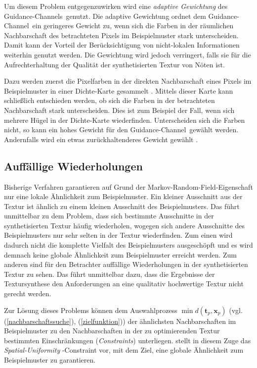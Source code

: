 Um diesem Problem entgegenzuwirken wird eine \emph{adaptive Gewichtung} des \glqq Gui\-dance-Channels\grqq \ genutzt.
Die adaptive Gewichtung ordnet dem \glqq Guidance-Channel\grqq \ ein geringeres Gewicht zu, wenn sich die Farben in der räumlichen Nachbarschaft des betrachteten Pixels im Beispielmuster stark unterscheiden.
Damit kann der Vorteil der Berücksichtigung von nicht-lokalen Informationen weiterhin genutzt werden.
Die Gewichtung wird jedoch verringert, falls sie für die Aufrechterhaltung der Qualität der synthetisierten Textur von Nöten ist.

Dazu werden zuerst die Pixelfarben in der direkten Nachbarschaft eines Pixels im Beispielmuster in einer Dichte-Karte gesammelt \cite{SelfTuning}.
Mittels dieser Karte kann schließlich entschieden werden, ob sich die Farben in der betrachteten Nachbarschaft stark unterscheiden.
Dies ist zum Beispiel der Fall, wenn sich mehrere Hügel in der Dichte-Karte wiederfinden.
Unterscheiden sich die Farben nicht, so kann ein hohes Gewicht für den \glqq Guidance-Channel\grqq \ gewählt werden.
Andernfalls wird ein etwas zurückhaltenderes Gewicht gewählt \cite{SelfTuning}.

\subsection{Auffällige Wiederholungen}

Bisherige Verfahren garantieren auf Grund der \glqq Markov-Random-Field\grqq -Eigenschaft nur eine lokale Ähnlichkeit zum Beispielmuster.
Ein kleiner Ausschnitt aus der Textur ist ähnlich zu einem kleinen Ausschnitt des Beispielmusters.
Das führt unmittelbar zu dem Problem, dass sich bestimmte Ausschnitte in der synthetisierten Textur häufig wiederholen, wogegen sich andere Ausschnitte des Beispielmusters nur sehr selten in der Textur wiederfinden.
Zum einen wird dadurch nicht die komplette Vielfalt des Beispielmusters ausgeschöpft und es wird demnach keine globale Ähnlichkeit zum Beispielmuster erreicht werden.
Zum anderen sind für den Betrachter auffällige Wiederholungen in der synthetisierten Textur zu sehen.
Das führt unmittelbar dazu, dass die Ergebnisse der Textursynthese den Anforderungen an eine qualitativ hochwertige Textur nicht gerecht werden.

Zur Lösung dieses Problems können dem Auswahlprozess $\min d(\textbf{t}_p, \textbf{x}_p)$ (vgl. (\ref{nachbarschaftssuche}), (\ref{zielfunktion})) der ähnlichsten Nachbarschaften im Beispielmuster zu den Nachbarschaften in der zu optimierenden Textur bestimmten Einschränkungen (\emph{Constraints}) unterliegen.
\cite{SelfTuning} stellt in diesem Zuge das \emph{\glqq Spatial-Uniformity\grqq} -Constraint vor, mit dem Ziel, eine globale Ähnlichkeit zum Beispielmuster zu garantieren.

